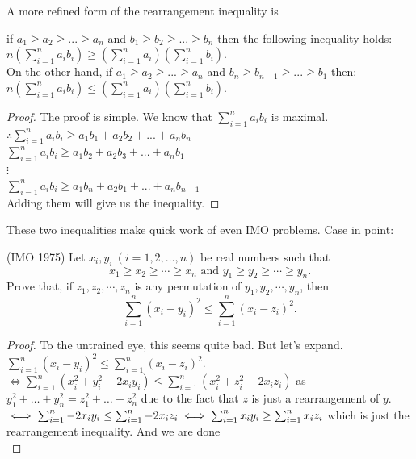 A more refined form of the rearrangement inequality is\\
\begin{theorem}
     if $a_1\geq a_2\geq ... \geq a_n$ and $b_1\geq b_2\geq ... \geq b_n$ then the following inequality holds:\\
$n \left(\sum_{i=1}^{n}a_ib_i\right)\geq\left(\sum_{i=1}^{n}a_i\right)\left(\sum_{i=1}^{n}b_i\right)$.\\
On the other hand, if $a_1\geq a_2\geq ... \geq a_n$ and $b_n\geq b_{n-1}\geq ... \geq b_1$ then: \\
$n \left(\sum_{i=1}^{n}a_ib_i\right)\leq\left(\sum_{i=1}^{n}a_i\right)\left(\sum_{i=1}^{n}b_i\right)$.
\end{theorem}
\begin{proof}
    The proof is simple. We know that $\sum^n_{i=1}a_ib_i$ is maximal.\\
    $\therefore \sum_{i=1}^{n}a_ib_i\geq a_1b_1+a_2b_2+...+a_n b_{n}$\\
    $\sum_{i=1}^{n}a_ib_i\geq a_1b_2+a_2b_3+...+a_nb_1$\\
    $\vdots$\\
    $\sum_{i=1}^{n}a_ib_i\geq a_1b_n+a_2b_1+...+a_nb_{n-1}$\\
    Adding them will give us the inequality.
\end{proof}
These two inequalities make quick work of even IMO problems. Case in point:\\
\begin{example}
(IMO 1975)
    Let $x_i, y_i~(i = 1, 2, \ldots, n)$ be real numbers such that\[x_1 \geq x_2 \geq \cdots \geq x_n \text{ and } y_1 \geq y_2 \geq \cdots \geq y_n.\]Prove that, if $z_1, z_2, \cdots, z_n$ is any permutation of $y_1, y_2, \cdots, y_n$, then\[\sum_{i=1}^n (x_i - y_i)^2 \leq \sum_{i=1}^n (x_i - z_i)^2.\]
\end{example}
\begin{proof}
    To the untrained eye, this seems quite bad. But let's expand.\\
    $\sum_{i=1}^n (x_i - y_i)^2 \leq \sum_{i=1}^n (x_i - z_i)^2.$\\
    $\iff \sum_{i=1}^n (x_i^2 + y_i^2-2x_iy_i) \leq \sum_{i=1}^n (x_i^2 + z_i^2 - 2x_iz_i)$ as $y_1^2+\dots+y_n^2=z_1^2+\dots+z_n^2$ due to the fact that $z$ is just a rearrangement of $y$.\\
    $\iff \sum_{i=1}^n -2x_iy_i \leq \sum_{i=1}^n - 2x_iz_i\\
    \iff \sum_{i=1}^n x_iy_i \geq \sum_{i=1}^n x_iz_i\\$ which is just the rearrangement inequality. And we are done\\
\end{proof}
